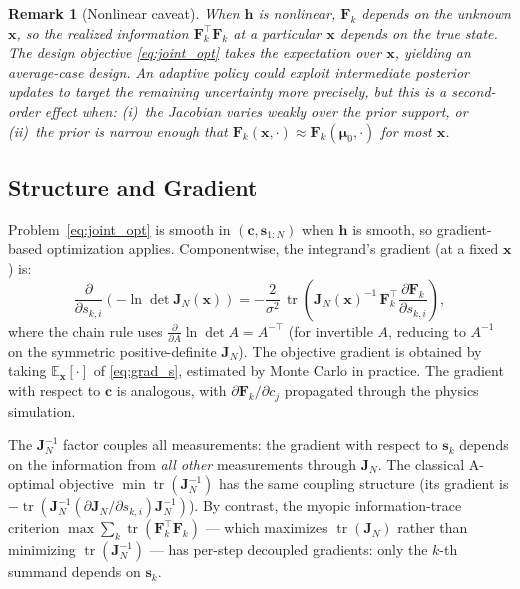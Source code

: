 \documentclass[11pt,a4paper]{article}
\newcommand{\E}{\mathbb{E}}
\newcommand{\tr}{\operatorname{tr}}
\newtheorem{remark}{Remark}
\begin{document}
\begin{remark}[Nonlinear caveat]
When $\bm{h}$ is nonlinear, $\bm{F}_k$ depends on the unknown $\bm{x}$, so the \emph{realized} information $\bm{F}_k^\top \bm{F}_k$ at a particular $\bm{x}$ depends on the true state.  The design objective \eqref{eq:joint_opt} takes the expectation over $\bm{x}$, yielding an \emph{average-case} design.  An adaptive policy could exploit intermediate posterior updates to target the remaining uncertainty more precisely, but this is a second-order effect when: (i)~the Jacobian varies weakly over the prior support, or (ii)~the prior is narrow enough that $\bm{F}_k(\bm{x}, \cdot) \approx \bm{F}_k(\bm{\mu}_0, \cdot)$ for most $\bm{x}$.
\end{remark}

\subsection{Structure and Gradient}

Problem~\eqref{eq:joint_opt} is smooth in $(\bm{c}, \bm{s}_{1:N})$ when $\bm{h}$ is smooth, so gradient-based optimization applies.  Componentwise, the integrand's gradient (at a fixed $\bm{x}$) is:
\begin{equation}
  \frac{\partial}{\partial s_{k,i}}\!\left(-\ln\det\bm{J}_N(\bm{x})\right) = -\frac{2}{\sigma^2}\,\tr\!\left(\bm{J}_N(\bm{x})^{-1}\,\bm{F}_k^\top \frac{\partial \bm{F}_k}{\partial s_{k,i}}\right),
  \label{eq:grad_s}
\end{equation}
where the chain rule uses $\frac{\partial}{\partial A}\ln\det A = A^{-\top}$ (for invertible $A$, reducing to $A^{-1}$ on the symmetric positive-definite $\bm{J}_N$).  The objective gradient is obtained by taking $\E_{\bm{x}}[\cdot]$ of \eqref{eq:grad_s}, estimated by Monte Carlo in practice.  The gradient with respect to $\bm{c}$ is analogous, with $\partial\bm{F}_k/\partial c_j$ propagated through the physics simulation.

The $\bm{J}_N^{-1}$ factor couples all measurements: the gradient with respect to $\bm{s}_k$ depends on the information from \emph{all other} measurements through $\bm{J}_N$.  The classical A-optimal objective $\min\tr(\bm{J}_N^{-1})$ has the same coupling structure (its gradient is $-\tr(\bm{J}_N^{-1}(\partial\bm{J}_N/\partial s_{k,i})\bm{J}_N^{-1})$).  By contrast, the myopic information-trace criterion $\max\sum_k\tr(\bm{F}_k^\top\bm{F}_k)$ --- which maximizes $\tr(\bm{J}_N)$ rather than minimizing $\tr(\bm{J}_N^{-1})$ --- has per-step decoupled gradients: only the $k$-th summand depends on $\bm{s}_k$.
\end{document}
